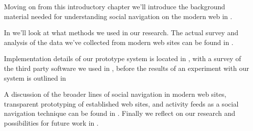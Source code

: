 Moving on from this introductory chapter we'll introduce the background
material needed for understanding social navigation on the modern web
in .


In  we'll look at what methods we used in our
research.
The actual survey and analysis of the data we've collected from modern web
sites can be found in .

Implementation details of our prototype system is located in
,
with a survey of the third party software we used in
,
before the results of an experiment with our system is outlined in

A discussion of the broader lines of social navigation in modern web sites,
transparent prototyping of established web sites, and activity feeds as
a social navigation technique can be found in .
Finally we reflect on our research and possibilities for future work
in .
